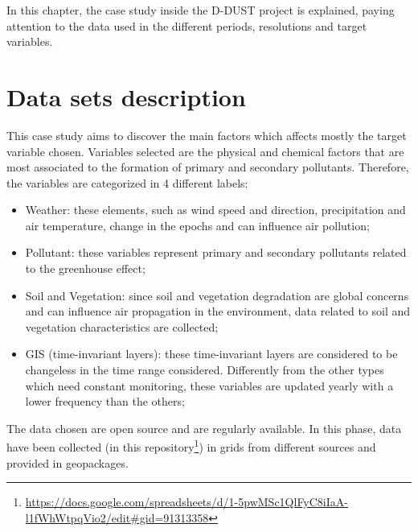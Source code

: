 In this chapter, the case study inside the D-DUST project is explained, paying attention to the data used in the different periods, resolutions and target variables.
\section{Data sets description}
This case study aims to discover the main factors which affects mostly the target variable chosen. 
Variables selected are the physical and chemical factors that are most associated to the formation of primary and secondary pollutants. \newline
Therefore, the variables are categorized in 4 different labels:
\begin{itemize}
\item Weather: these elements, such as wind speed and direction, precipitation and air temperature, change in the epochs and can influence air pollution;
\item Pollutant: these variables represent primary and secondary pollutants related to the greenhouse effect;
\item Soil and Vegetation: since soil and vegetation degradation are global concerns and can influence air propagation in the environment, data related to soil and vegetation characteristics are collected;
\item GIS (time-invariant layers): these time-invariant layers are considered to be changeless in the time range considered. Differently from the other types which need constant monitoring, these variables are updated yearly with a lower frequency than the others;
\end{itemize}
The data chosen are open source and are regularly available.
In this phase, data have been collected (in this repository\footnote{ \url{https://docs.google.com/spreadsheets/d/1-5pwMSc1QlFyC8iIaA-l1fWhWtpqVio2/edit\#gid=91313358}}) in grids from different sources and provided in geopackages. 
